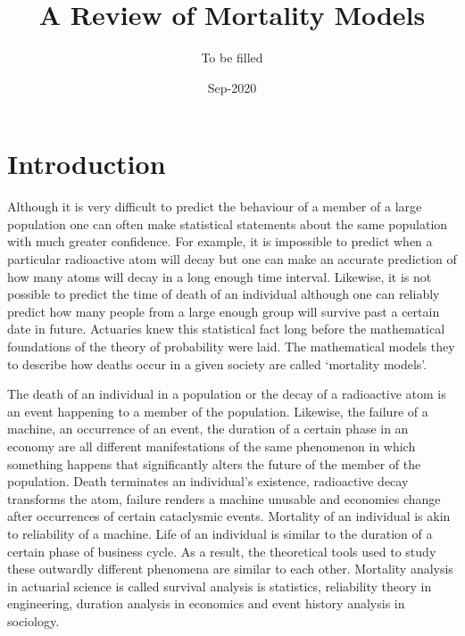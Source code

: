 \documentclass{article}
\title{A Review of Mortality Models}
\author{To be filled}
\date{Sep-2020}
\numberwithin{equation}{section}
\begin{document}
\maketitle
\section{Introduction}\label{s0}
Although it is very difficult to predict the behaviour of a member of a large
population one can often make statistical statements about the same population 
with much greater 
confidence. For example, it is impossible to predict when a particular 
radioactive atom will decay but one can make an accurate prediction of how 
many atoms will decay in a long enough time interval. Likewise, it is not
possible to predict the time of death of an individual although one can reliably
predict how many people from a large enough group will survive past a certain
date in future. Actuaries knew this statistical fact long before the 
mathematical foundations of the theory of probability were laid. The 
mathematical models they to describe how deaths occur in a given society are
called `mortality models'.

The death of an individual in a population or the decay of a radioactive atom
is an event happening to a member of the population. Likewise, the failure of
a machine, an occurrence of an event, the duration of a certain phase in an
economy are all different manifestations of the same phenomenon in which 
something happens that significantly alters the future of the member of the
population. Death terminates an individual's existence, radioactive decay
transforms the atom, failure renders a machine unusable and economies change 
after occurrences of certain cataclysmic events. Mortality of an individual
is akin to reliability of a machine. Life of an individual is similar to
the duration of a certain phase of business cycle. As a result, the 
theoretical tools used to study these outwardly different phenomena are similar 
to each other. 
Mortality analysis in actuarial science is called survival analysis is 
statistics, reliability theory in engineering, duration analysis in economics 
and event history analysis in sociology.
\end{document}
